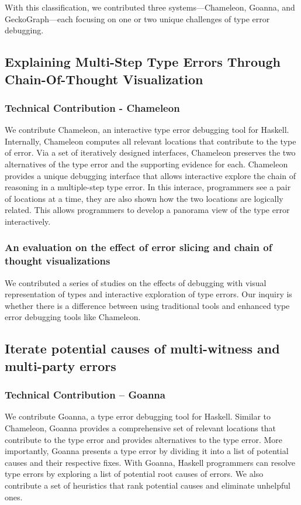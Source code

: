 With this classification, we contributed three systems—Chameleon, Goanna, and GeckoGraph—each focusing on one or two unique challenges of type error debugging.

\subsection{Explaining Multi-Step Type Errors Through Chain-Of-Thought Visualization}

\subsubsection{Technical Contribution - Chameleon}
We contribute Chameleon, an interactive type error debugging tool for Haskell. Internally, Chameleon computes all relevant locations that contribute to the type of error. Via a set of iteratively designed interfaces, Chameleon preserves the two alternatives of the type error and the supporting evidence for each. Chameleon provides a unique debugging interface that allows interactive explore the chain of reasoning in a multiple-step type error. In this interace, programmers see a pair of locations at a time, they are also shown how the two locations are logically related. This allows programmers to develop a panorama view of the type error interactively. 

\subsubsection{An evaluation on the effect of error slicing and chain of thought visualizations}
We contributed a series of studies on the effects of debugging with visual representation of types and interactive exploration of type errors. Our inquiry is whether there is a difference between using traditional tools and enhanced type error debugging tools like Chameleon. 

\subsection{Iterate potential causes of multi-witness and multi-party errors}

\subsubsection{Technical Contribution -- Goanna}
We contribute Goanna, a type error debugging tool for Haskell. 
Similar to Chameleon, Goanna provides a comprehensive set of relevant locations that contribute to the type error and provides alternatives to the type error. More importantly,  Goanna presents a type error by dividing it into a list of potential causes and their respective fixes. With Goanna, Haskell programmers can resolve type errors by exploring a list of potential root causes of errors. We also contribute a set of heuristics that rank potential causes and eliminate unhelpful ones. 

